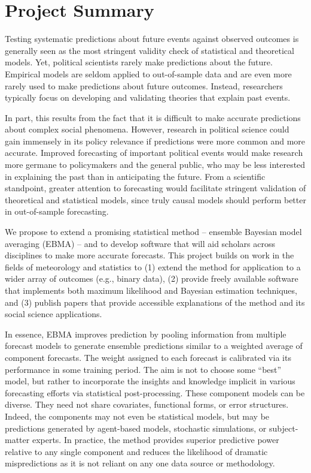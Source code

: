 \documentclass[pdftex,12pt,fullpage,oneside]{amsart}
\begin{document}
\section*{Project Summary}

\thispagestyle{empty}

Testing systematic predictions about future events against observed
outcomes is generally seen as the most stringent validity check of
statistical and theoretical models. Yet, political scientists rarely
make predictions about the future.  Empirical models are seldom
applied to out-of-sample data and are even more rarely used to make
predictions about future outcomes. Instead, researchers typically
focus on developing and validating theories that explain past events.

In part, this results from the fact that it is difficult to make
accurate predictions about complex social phenomena. However, research
in political science could gain immensely in its policy relevance if
predictions were more common and more accurate.  Improved forecasting
of important political events would make research more germane to
policymakers and the general public, who may be less interested in
explaining the past than in anticipating the future.  From a
scientific standpoint, greater attention to forecasting would
facilitate stringent validation of theoretical and statistical models,
since truly causal models should perform better in out-of-sample
forecasting.

We propose to extend a promising statistical method -- ensemble
Bayesian model averaging (EBMA) -- and to develop software that will
aid scholars across disciplines to make more accurate forecasts.
This project builds on work in the fields of meteorology and
statistics to (1) extend the method for application to a wider array
of outcomes (e.g., binary data), (2) provide freely available software
that implements both maximum likelihood and Bayesian estimation
techniques, and (3) publish papers that provide accessible
explanations of the method and its social science applications.

In essence, EBMA improves prediction by pooling information from
multiple forecast models to generate ensemble predictions similar to a
weighted average of component forecasts. The weight assigned to each
forecast is calibrated via its performance in some training
period. The aim is not to choose some ``best'' model, but rather to
incorporate the insights and knowledge implicit in various forecasting
efforts via statistical post-processing.  These component models can be
diverse.  They need not share covariates, functional forms, or error
structures. Indeed, the components may not even be statistical models,
but may be predictions generated by agent-based models, stochastic
simulations, or subject-matter experts.  In practice, the method provides
superior predictive power relative to any single component and reduces
the likelihood of dramatic mispredictions as it is not reliant on any
one data source or methodology.
\end{document}
